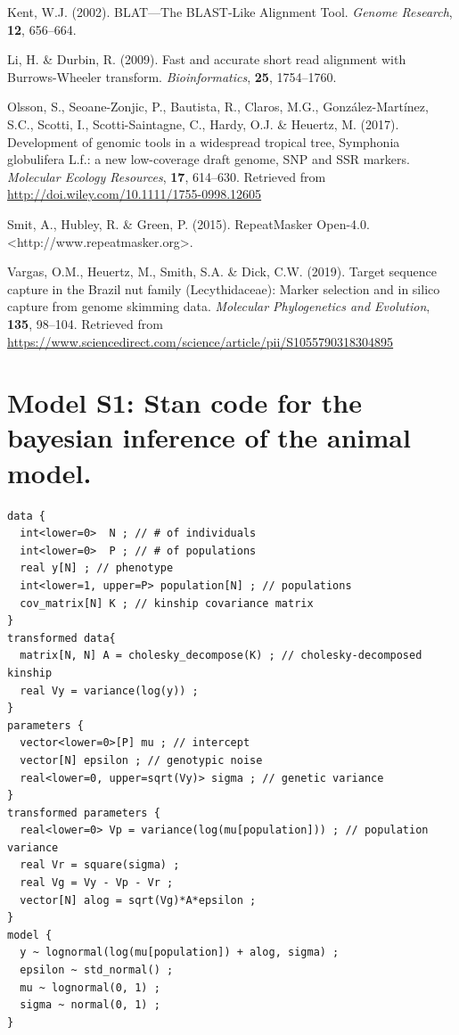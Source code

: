 \documentclass[12pt,]{article}
\begin{document}
\leavevmode\hypertarget{ref-Kent2002}{}%
Kent, W.J. (2002). BLAT---The BLAST-Like Alignment Tool. \emph{Genome Research}, \textbf{12}, 656--664.

\leavevmode\hypertarget{ref-Li2009}{}%
Li, H. \& Durbin, R. (2009). Fast and accurate short read alignment with Burrows-Wheeler transform. \emph{Bioinformatics}, \textbf{25}, 1754--1760.

\leavevmode\hypertarget{ref-Olsson2017}{}%
Olsson, S., Seoane-Zonjic, P., Bautista, R., Claros, M.G., González-Martínez, S.C., Scotti, I., Scotti-Saintagne, C., Hardy, O.J. \& Heuertz, M. (2017). Development of genomic tools in a widespread tropical tree, Symphonia globulifera L.f.: a new low-coverage draft genome, SNP and SSR markers. \emph{Molecular Ecology Resources}, \textbf{17}, 614--630. Retrieved from \url{http://doi.wiley.com/10.1111/1755-0998.12605}

\leavevmode\hypertarget{ref-Smit2015}{}%
Smit, A., Hubley, R. \& Green, P. (2015). RepeatMasker Open-4.0. \textless{}http://www.repeatmasker.org\textgreater{}.

\leavevmode\hypertarget{ref-Vargas2019}{}%
Vargas, O.M., Heuertz, M., Smith, S.A. \& Dick, C.W. (2019). Target sequence capture in the Brazil nut family (Lecythidaceae): Marker selection and in silico capture from genome skimming data. \emph{Molecular Phylogenetics and Evolution}, \textbf{135}, 98--104. Retrieved from \url{https://www.sciencedirect.com/science/article/pii/S1055790318304895}

\newpage

\hypertarget{model-s1-stan-code-for-the-bayesian-inference-of-the-animal-model.}{%
\section{Model S1: Stan code for the bayesian inference of the animal model.}\label{model-s1-stan-code-for-the-bayesian-inference-of-the-animal-model.}}

\begin{verbatim}
data {
  int<lower=0>  N ; // # of individuals
  int<lower=0>  P ; // # of populations
  real y[N] ; // phenotype
  int<lower=1, upper=P> population[N] ; // populations
  cov_matrix[N] K ; // kinship covariance matrix
}
transformed data{
  matrix[N, N] A = cholesky_decompose(K) ; // cholesky-decomposed kinship
  real Vy = variance(log(y)) ;
}
parameters {
  vector<lower=0>[P] mu ; // intercept
  vector[N] epsilon ; // genotypic noise
  real<lower=0, upper=sqrt(Vy)> sigma ; // genetic variance
}
transformed parameters {
  real<lower=0> Vp = variance(log(mu[population])) ; // population variance
  real Vr = square(sigma) ;
  real Vg = Vy - Vp - Vr ;
  vector[N] alog = sqrt(Vg)*A*epsilon ;
}
model {
  y ~ lognormal(log(mu[population]) + alog, sigma) ;
  epsilon ~ std_normal() ;
  mu ~ lognormal(0, 1) ;
  sigma ~ normal(0, 1) ;
}
\end{verbatim}
\end{document}
